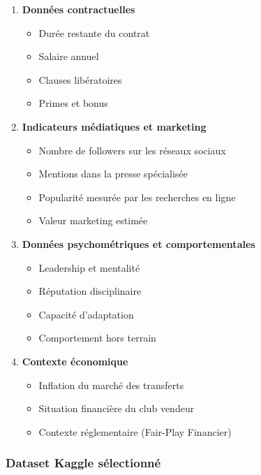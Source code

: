 \documentclass[12pt,a4paper]{article}
\begin{document}
\begin{enumerate}[leftmargin=*]
    \item \textbf{Données contractuelles}
    \begin{itemize}
        \item Durée restante du contrat
        \item Salaire annuel
        \item Clauses libératoires
        \item Primes et bonus
    \end{itemize}
    
    \item \textbf{Indicateurs médiatiques et marketing}
    \begin{itemize}
        \item Nombre de followers sur les réseaux sociaux
        \item Mentions dans la presse spécialisée
        \item Popularité mesurée par les recherches en ligne
        \item Valeur marketing estimée
    \end{itemize}
    
    \item \textbf{Données psychométriques et comportementales}
    \begin{itemize}
        \item Leadership et mentalité
        \item Réputation disciplinaire
        \item Capacité d'adaptation
        \item Comportement hors terrain
    \end{itemize}
    
    \item \textbf{Contexte économique}
    \begin{itemize}
        \item Inflation du marché des transferts
        \item Situation financière du club vendeur
        \item Contexte réglementaire (Fair-Play Financier)
    \end{itemize}
\end{enumerate}

\subsubsection{Dataset Kaggle sélectionné}
\end{document}
